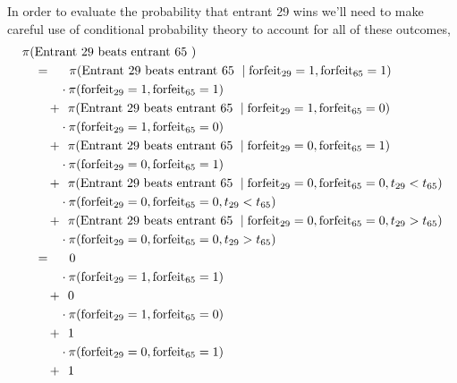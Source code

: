 \documentclass[
  letterpaper,
  DIV=11,
  numbers=noendperiod]{scrartcl}
\begin{document}
In order to evaluate the probability that entrant 29 wins we'll need to
make careful use of conditional probability theory to account for all of
these outcomes, \begin{align*}
\pi( &\text{Entrant 29 beats entrant 65 } )
\\
&=\quad\;\,
\pi( \text{Entrant 29 beats entrant 65 } \mid
     \mathrm{forfeit}_{29} = 1, \mathrm{forfeit}_{65} = 1)
\\
&\quad\quad \cdot \pi( \mathrm{forfeit}_{29} = 1, \mathrm{forfeit}_{65} = 1 )
\\
&\quad+ \;\,
\pi( \text{Entrant 29 beats entrant 65 } \mid
     \mathrm{forfeit}_{29} = 1, \mathrm{forfeit}_{65} = 0)
\\
&\quad\quad \cdot \pi( \mathrm{forfeit}_{29} = 1, \mathrm{forfeit}_{65} = 0 )
\\
&\quad+ \;\,
\pi( \text{Entrant 29 beats entrant 65 } \mid
     \mathrm{forfeit}_{29} = 0, \mathrm{forfeit}_{65} = 1)
\\
&\quad\quad \cdot \pi( \mathrm{forfeit}_{29} = 0, \mathrm{forfeit}_{65} = 1 )
\\
&\quad+ \;\,
\pi( \text{Entrant 29 beats entrant 65 } \mid
     \mathrm{forfeit}_{29} = 0, \mathrm{forfeit}_{65} = 0, t_{29} < t_{65})
\\
&\quad\quad \cdot \pi( \mathrm{forfeit}_{29} = 0, \mathrm{forfeit}_{65} = 0,
                      t_{29} < t_{65})
\\
&\quad+ \;\,
\pi( \text{Entrant 29 beats entrant 65 } \mid
     \mathrm{forfeit}_{29} = 0, \mathrm{forfeit}_{65} = 0, t_{29} > t_{65})
\\
&\quad\quad \cdot \pi( \mathrm{forfeit}_{29} = 0, \mathrm{forfeit}_{65} = 0,
                       t_{29} > t_{65})
\\
&=\quad\;\,
\vphantom{\pi( \text{Entrant 29 beats entrant 65 } \mid} 0
\\
&\quad\quad \cdot \pi( \mathrm{forfeit}_{29} = 1, \mathrm{forfeit}_{65} = 1 )
\\
&\quad+ \;\,
\vphantom{\pi( \text{Entrant 29 beats entrant 65 } \mid} 0
\\
&\quad\quad \cdot \pi( \mathrm{forfeit}_{29} = 1, \mathrm{forfeit}_{65} = 0 )
\\
&\quad+ \;\,
\vphantom{\pi( \text{Entrant 29 beats entrant 65 } \mid} 1
\\
&\quad\quad \cdot \pi( \mathrm{forfeit}_{29} = 0, \mathrm{forfeit}_{65} = 1 )
\\
&\quad+ \;\,
\vphantom{\pi( \text{Entrant 29 beats entrant 65 } \mid} 1

\end{align*}
\end{document}
